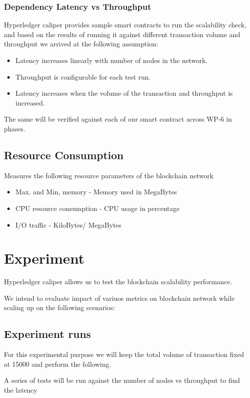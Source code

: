 \documentclass{ceadar_article}
\begin{document}
\subsubsection{Dependency Latency vs Throughput}
Hyperledger caliper provides sample smart contracts to run the scalability check, and based on the results of running it against different transaction volume and throughput we arrived at the following assumption:

\begin{itemize}
    \item Latency increases linearly with number of nodes in the network.
    \item Throughput is configurable for each test run.
    \item Latency increases when the volume of the transaction and throughput is increased. 
\end{itemize}

The same will be verified against each of our smart contract across WP-6 in phases.

\subsection{Resource Consumption} Measures the following resource parameters of the blockchain network
\begin{itemize}
    \item Max. and Min, memory - Memory used in MegaBytes
    \item CPU resource consumption - CPU usage in percentage
    \item I/O traffic - KiloBytes/ MegaBytes
\end{itemize}

\section{Experiment}
Hyperledger caliper allows us to test the blockchain scalability performance. 

We intend to evaluate impact of variuos metrics on blockchain network while scaling up on the following scenarios:

\subsection {Experiment runs}
For this experimental purpose we will keep the total volume of transaction fixed at 15000 and perform the following. 

A series of tests will be run against the number of nodes vs throughput to find the latency
\end{document}
